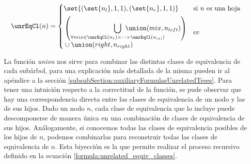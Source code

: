 \begin{align}\label{formula:unrelated_equiv_classes}
    \unrEqCl(n) = 
    \begin{cases} 
    \set{(\set{n_l}, 1, 1), (\set{n_r},1,1)} & \text{si $n$ es una hoja} \\[1ex]
    \begin{aligned}
    &\left( \bigcup_{\forall mix \in \unrEqCl(n_1) \times \dots \times \unrEqCl(n_{|n|})} \hspace{-6em} \union(mix,n_{left})\right) \\
    &\cup \union(right,n_{right})
    \end{aligned} & \text{cc}
    \end{cases}
\end{align}


La función \textit{union} nos sirve para combinar las distintas clases de equivalencia de cada subárbol, para una explicación más detallada de la misma pueden ir al apéndice a la sección \ref{subsubSection:auxiliaryFormulasUnrelatedTrees}. Para tener una intuición respecto a la correctitud de la función, se pude observar que hay una correspondencia directa entre las clases de equivalencia de un nodo y las de sus hijos. Dado un nodo $n$, cada clase de equivalencia que lo incluye puede descomponerse de manera única en una combinación de clases de equivalencia de sus hijos. Análogamente, si conocemos todas las clases de equivalencia posibles de los hijos de $n$, podemos combinarlas para reconstruir todas las clases de equivalencia de $n$. Esta biyección es la que permite realizar el proceso recursivo definido en la ecuación \ref{formula:unrelated_equiv_classes}.

